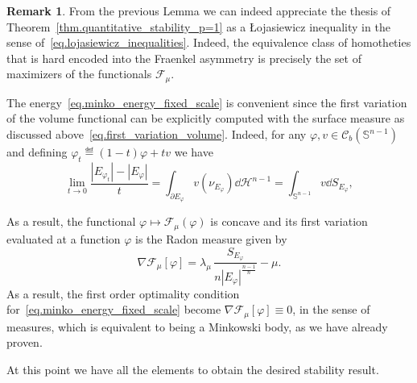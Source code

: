 \documentclass[a4paper, 10pt, twoside]{amsart}
\numberwithin{equation}{section}
\newcommand{\remkname}{Remark}
\theoremstyle{plain}
\theoremstyle{definition}
\newtheorem{remark}[theorem]{\remkname}
\begin{document}
\begin{remark}\label{remark.lojasiewicz}
    From the previous Lemma we can indeed appreciate the thesis of Theorem~\ref{thm.quantitative_stability_p=1} as a Łojasiewicz inequality in the sense of~\eqref{eq.lojasiewicz_inequalities}. Indeed, the equivalence class of homotheties that is hard encoded into the Fraenkel asymmetry is precisely the set of maximizers of the functionals $\mathscr{F}_\mu$. 
\end{remark}

The energy~\eqref{eq.minko_energy_fixed_scale} is convenient since the first variation of the volume functional can be explicitly computed with the surface measure as discussed above~\eqref{eq.first_variation_volume}. Indeed, for any $\varphi, v \in \mathscr{C}_b(\mathbb{S}^{n-1})$ and defining $\varphi_t \eqdef (1-t)\varphi + t v$ we have
\begin{equation}
    \lim_{t \to 0} \frac{|E_{\varphi_t}| - |E_{\varphi}|}{t} 
    = 
    \int_{\partial E_{\varphi}} v(\nu_{E_{\varphi}}) \dd \mathcal{H}^{n-1}
    =
    \int_{\mathbb{S}^{n-1}} v \dd S_{E_{\varphi}},
\end{equation}

As a result, the functional $\varphi \mapsto \mathscr{F}_\mu(\varphi)$ is concave and its first variation evaluated at a function $\varphi$ is the Radon measure given by 
\begin{equation}\label{eq.1st_order}
    \nabla \mathscr{F}_\mu[\varphi] 
    = 
    \lambda_\mu\,
    \frac{ S_{E_\varphi}}{n{|E_\varphi|}^{\frac{n-1}{n}}}
    -
    \mu. 
\end{equation}
As a result, the first order optimality condition for~\eqref{eq.minko_energy_fixed_scale} become $\nabla \mathscr{F}_\mu[\varphi] \equiv 0$, in the sense of measures, which is equivalent to being a Minkowski body, as we have already proven. 

At this point we have all the elements to obtain the desired stability result. 
\end{document}
